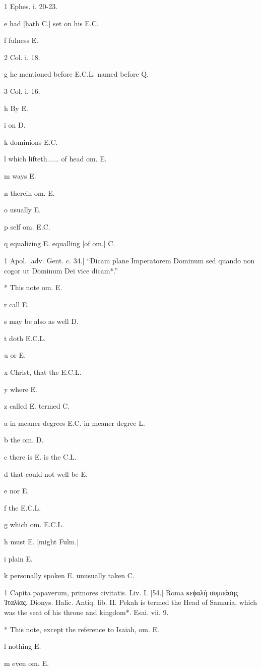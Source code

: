 1
Ephes. i. 20-23.

e
had [hath C.] set on his E.C.

f
fulness E.

2
Col. i. 18.

g
he mentioned before E.C.L. named before Q.

3
Col. i. 16.

h
By E.

i
on D.

k
dominions E.C.

l
which lifteth...... of head om. E.

m
ways E.

n
therein om. E.

o
usually E.

p
self om. E.C.

q
equalizing E. equalling [of om.] C.

1
Apol. [adv. Gent. c. 34.] “Dicam plane Imperatorem Dominum sed quando non cogor ut Dominum Dei vice dicam*.”

*
This note om. E.

r
call E.

s
may be also as well D.

t
doth E.C.L.

u
or E.

x
Christ, that the E.C.L.

y
where E.

z
called E. termed C.

a
in meaner degrees E.C. in meaner degree L.

b
the om. D.

c
there is E. is the C.L.

d
that could not well be E.

e
nor E.

f
the E.C.L.

g
which om. E.C.L.

h
must E. [might Fulm.]

i
plain E.

k
personally spoken E. unusually taken C.

1
Capita papaverum, primores civitatis. Liv. I. [54.] Roma κεϕαλὴ συμπάσης Ἰταλίας. Dionys. Halic. Antiq. lib. II. Pekah is termed the Head of Samaria, which was the seat of his throne and kingdom*. Esai. vii. 9.

*
This note, except the reference to Isaiah, om. E.

l
nothing E.

m
even om. E.

